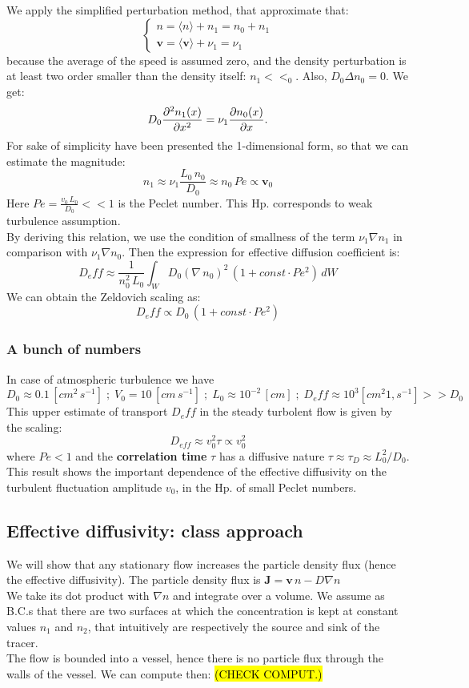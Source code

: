 \documentclass[a4paper,11pt]{article}
\newcommand{\pvir}{\; ; \;} %
\newcommand{\cic}[1]{\mathbf{#1}}
\newcommand{\avg}[1]{\langle #1 \rangle}
\begin{document}
 We apply the simplified perturbation method, that approximate that:
 \[\begin{cases} n=\avg{ n}+n_1=n_0+n_1 \\ \cic{v}=\avg{ \cic{v} }+\nu_1=\nu_1 \end{cases} \]
 because the average of the speed is assumed zero, and the density perturbation is at least two order smaller than the density itself: $n_1<<_0$. Also, $D_0\Delta n_0=0$. We get:
 \[D_0 \pdv[2]{n_1(x)}{x}=\nu_1 \pdv{n_0(x)}{x}. \]
  For sake of simplicity have been presented the 1-dimensional form, so that we can estimate the magnitude:
 \[ n_1 \approx \nu_1 \frac{L_0\,n_0}{D_0} \approx n_0 \, Pe \propto \cic{v}_0 \]
 Here $Pe=\frac{v_0 \, L_0}{D_0}<<1$ is the Peclet number. This Hp. corresponds to weak turbulence assumption.\\
 By deriving this relation, we use the condition of smallness of the term $\nu_1 \nabla n_1$ in comparison with $\nu_1 \nabla n_0$. Then the expression for effective diffusion coefficient is:
 \[ D_eff \approx \frac{1}{n_0^2\,L_0}\int_W D_0 (\nabla\,n_0)^2 \, 
 (1+const \cdot Pe^2)\,dW  \]
 We can obtain the Zeldovich scaling as:
 \[D_eff \propto D_0 \, (1+const \cdot Pe^2)\]
 
 \subsubsection{A bunch of numbers}
 In case of atmospheric turbulence we have $D_0 \approx 0.1 \, [cm^2 \, s^{-1}] \pvir V_0=10 \, [cm \, s^{-1}] \pvir L_0 \approx 10^{-2}\,[cm] \pvir D_eff \approx 10^3 [cm^2 1,s^{-1}]>>D_0$
 This upper estimate of transport $D_eff$ in the steady turbolent flow is given by the scaling:
 \[ D_{eff} \approx v_0^2 \tau \propto v_0^2 \] where $Pe<1$ and the \textbf{correlation time} $\tau$ has a diffusive nature $\tau \approx \tau_D \approx L_0^2 / D_0$.\\
 This result shows the important dependence of the effective diffusivity on the turbulent fluctuation amplitude $v_0$, in the Hp. of small Peclet numbers.
 

 \subsection{Effective diffusivity: class approach}
 We will show that any stationary flow increases the particle density flux (hence the effective diffusivity). The particle density flux is $\cic{J}=\cic{v}\,n-D\nabla n$\\
 We take its dot product with $\nabla n$ and integrate over a volume. We assume as B.C.s that there are two surfaces at which the concentration is kept at constant values $n_1$ and $n_2$, that intuitively are respectively the source and sink of the tracer.\\
 The flow is bounded into a vessel, hence there is no particle flux through the walls of the vessel. We can compute then: \hl{(CHECK COMPUT.)}
 
\end{document}
